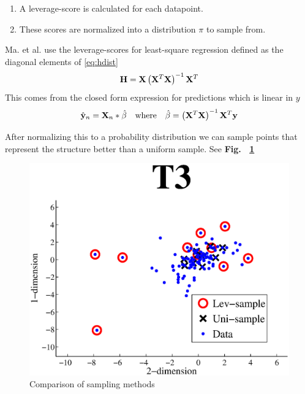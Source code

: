\documentclass{article}
\begin{document}
\begin{enumerate}
\item A leverage-score is calculated for each datapoint.
\item These scores are normalized into a distribution $\pi$ to sample from.
\end{enumerate}

Ma. et al. \cite{Ma} use the leverage-scores for least-square regression defined as the diagonal elements of \eqref{eq:hdist}
\begin{equation}
{\bf H} = {\bf X} \left( {\bf X}^T {\bf X} \right)^{-1} {\bf X}^T
 \label{eq:hdist}
\end{equation}
This comes from the closed form expression for predictions which is linear in $y$
\begin{equation*}
	\hat{{\bf y}}_n = {\bf X}_n*\hat{\beta} \quad \text{where} \quad \hat{\beta} = \left( {\bf X}^T {\bf X} \right)^{-1} {\bf X}^T {\bf y} 
\end{equation*}

After normalizing this to a probability distribution we can sample  points that represent the structure better than a uniform sample. See {\bf Fig.~ \ref{fig:selection}}

\begin{figure}[t]
	\centering
    \includegraphics[width=.6\linewidth]{images/selection.eps}
    \caption{Comparison of sampling methods}
    \label{fig:selection}
\end{figure}
\end{document}
